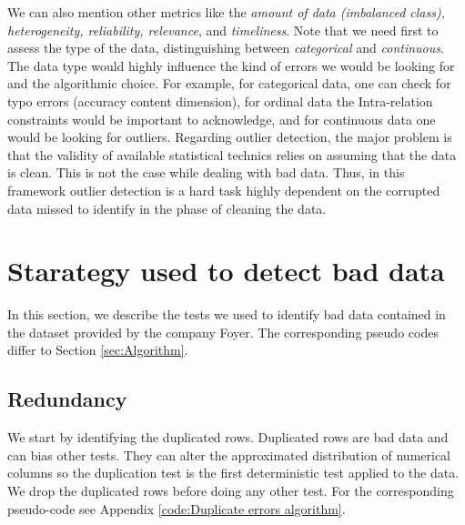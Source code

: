 \documentclass{article}
\begin{document}
We can also mention other metrics like the \textit{amount of data (imbalanced class), heterogeneity, reliability, relevance}, and \textit{timeliness}.
Note that we need first to assess the type of the data, distinguishing between \textit{categorical} and \textit{continuous}.
The data type would highly influence the kind of errors we would be looking for and the algorithmic choice.
For example, for categorical data, one can check for typo errors (accuracy content dimension), for ordinal data the Intra-relation constraints would be important to acknowledge, and for continuous data one would be looking for outliers.
Regarding outlier detection, the major problem is that the validity of available statistical technics relies on assuming that the data is clean.
This is not the case while dealing with bad data.
Thus, in this framework outlier detection is a hard task highly dependent on the corrupted data missed to identify in the phase of cleaning the data.
\section{Starategy used to detect bad data}
\label{sec:Starategy used to detect bad data}
In this section, we describe the tests we used to identify bad data contained in the dataset provided by the company Foyer.
The corresponding pseudo codes differ to Section \ref{sec:Algorithm}.

\subsection{Redundancy} %
\label{sub:Redundancy}
We start by identifying the duplicated rows.
Duplicated rows are bad data and can bias other tests.
They can alter the approximated distribution of numerical columns so the duplication test is the first deterministic test applied to the data.
We drop the duplicated rows before doing any other test.
For the corresponding pseudo-code see Appendix \ref{code:Duplicate errors algorithm}.
\end{document}
